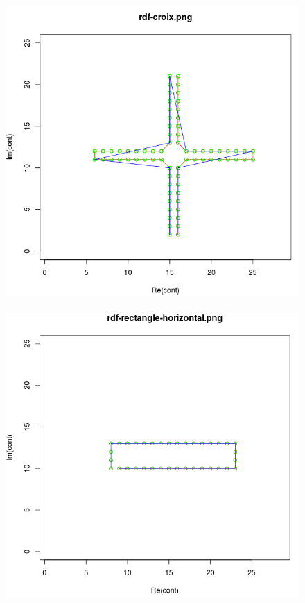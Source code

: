 \documentclass[a4paper,12pt]{report}
\begin{document}
\begin{figure}[!ht]
{	}
	\hbox{ 
     	\hspace*{1cm}
		\includegraphics[scale=0.3]{image/fourier8.png}
     	\hspace*{1cm}
		\includegraphics[scale=0.3]{image/fourier9.png}
	}
\end{figure}
\end{document}

